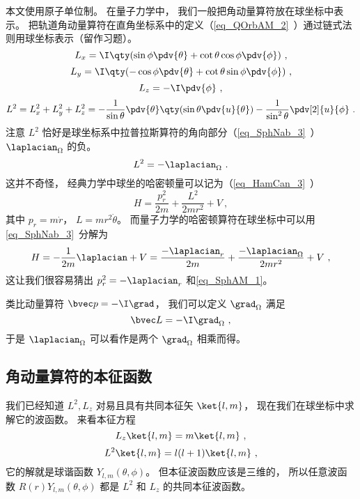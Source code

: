 

本文使用原子单位制。 在量子力学中， 我们一般把角动量算符放在球坐标中表示。 把轨道角动量算符在直角坐标系中的定义（\autoref{eq_QOrbAM_2}~）通过链式法则用球坐标表示（留作习题）。
\begin{equation}
L_x = \I \qty(\sin\phi\pdv{\theta} + \cot\theta\cos\phi\pdv{\phi})~,
\end{equation}
\begin{equation}
L_y = \I \qty(-\cos\phi\pdv{\theta} + \cot\theta \sin\phi \pdv{\phi})~,
\end{equation}
\begin{equation}
L_z = -\I\pdv{\phi}~,
\end{equation}
\begin{equation}
L^2 = L_x^2 + L_y^2 + L_z^2 = -\frac{1}{\sin\theta}\pdv{\theta} \qty(\sin \theta \pdv{u}{\theta}) - \frac{1}{\sin^2 \theta} \pdv[2]{u}{\phi}~.
\end{equation}
注意 $L^2$ 恰好是球坐标系中拉普拉斯算符的角向部分（\autoref{eq_SphNab_3}~） $\laplacian_\Omega$ 的负。
\begin{equation}\label{eq_SphAM_1}
L^2 = -\laplacian_\Omega~.
\end{equation}
这并不奇怪， 经典力学中球坐的哈密顿量可以记为（\autoref{eq_HamCan_3}~）
\begin{equation}
H = \frac{p_r^2}{2m} + \frac{L^2}{2mr^2} + V~,
\end{equation}
其中 $p_r = m\dot r$， $L = mr^2\dot\theta$。 而量子力学的哈密顿算符在球坐标中可以用\autoref{eq_SphNab_3}~分解为
\begin{equation}
H = -\frac{1}{2m}\laplacian + V = \frac{-\laplacian_r}{2m} +\frac{-\laplacian_\Omega}{2mr^2} + V~,
\end{equation}
这让我们很容易猜出 $p_r^2 = -\laplacian_r$ 和\autoref{eq_SphAM_1}。

类比动量算符 $\bvec p = -\I \grad$， 我们可以定义 $\grad_\Omega$ 满足
\begin{equation}
\bvec L = -\I \grad_\Omega~,
\end{equation}
于是 $\laplacian_\Omega$ 可以看作是两个 $\grad_\Omega$ 相乘而得。

\subsection{角动量算符的本征函数}
我们已经知道 $L^2, L_z$ 对易且具有共同本征矢 $\ket{l, m}$， 现在我们在球坐标中求解它的波函数。 来看本征方程
\begin{equation}
L_z \ket{l, m} = m\ket{l, m}~,
\end{equation}
\begin{equation}
L^2 \ket{l, m} = l(l+1)\ket{l, m}~,
\end{equation}
它的解就是球谐函数 $Y_{l,m}(\theta,\phi)$。 但本征波函数应该是三维的， 所以任意波函数 $R(r)Y_{l,m}(\theta, \phi)$ 都是 $L^2$ 和 $L_z$ 的共同本征波函数。
